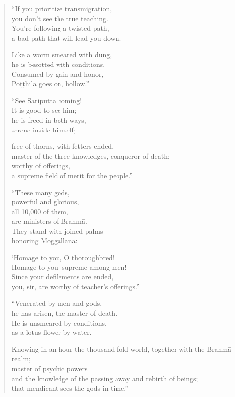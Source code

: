 \documentclass[12pt,openany]{book}%
\begin{document}
\begin{verse}
“If you prioritize transmigration, \\
you don’t see the true teaching. \\
You’re following a twisted path, \\
a bad path that will lead you down. 

Like a worm smeared with dung, \\
he is besotted with conditions. \\
Consumed by gain and honor, \\
\textsanskrit{Poṭṭhila} goes on, hollow.” 

“See \textsanskrit{Sāriputta} coming! \\
It is good to see him; \\
he is freed in both ways, \\
serene inside himself; 

free of thorns, with fetters ended, \\
master of the three knowledges, conqueror of death; \\
worthy of offerings, \\
a supreme field of merit for the people.” 

“These many gods, \\
powerful and glorious, \\
all 10,000 of them, \\
are ministers of \textsanskrit{Brahmā}. \\
They stand with joined palms \\
honoring \textsanskrit{Moggallāna}: 

‘Homage to you, O thoroughbred! \\
Homage to you, supreme among men! \\
Since your defilements are ended, \\
you, sir, are worthy of teacher’s offerings.” 

“Venerated by men and gods, \\
he has arisen, the master of death. \\
He is unsmeared by conditions, \\
as a lotus-flower by water. 

Knowing in an hour the thousand-fold world, together with the \textsanskrit{Brahmā} realm; \\
master of psychic powers \\
and the knowledge of the passing away and rebirth of beings; \\
that mendicant sees the gods in time.” 


\end{verse}
\end{document}
